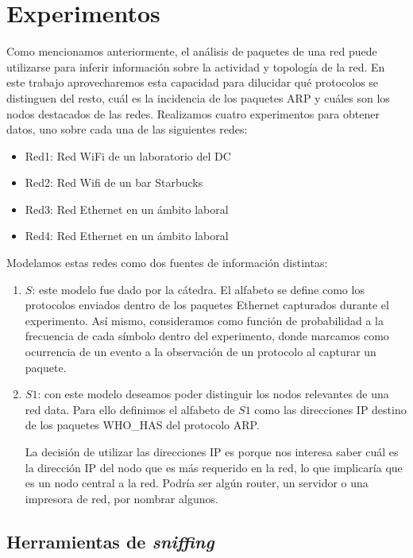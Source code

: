 \section{Experimentos}

Como mencionamos anteriormente, el análisis de paquetes de una red puede utilizarse para inferir información sobre la actividad y topología de la red. En este trabajo aprovecharemos esta capacidad para dilucidar qué protocolos se distinguen del resto, cuál es la incidencia de los paquetes ARP y cuáles son los nodos destacados de las redes.
Realizamos cuatro experimentos para obtener datos, uno sobre cada una de las siguientes redes:
\begin{itemize}
	\item Red1: Red WiFi de un laboratorio del DC
	\item Red2: Red Wifi de un bar Starbucks
	\item Red3: Red Ethernet en un ámbito laboral
	\item Red4: Red Ethernet en un ámbito laboral
\end{itemize}

Modelamos estas redes como dos fuentes de información distintas:
\begin{enumerate}
	\item $S$: este modelo fue dado por la cátedra. El alfabeto se define como los protocolos enviados dentro de los paquetes Ethernet capturados durante el experimento. Así mismo, consideramos como función de probabilidad a la frecuencia de cada símbolo dentro del experimento, donde marcamos como ocurrencia de un evento a la observación de un protocolo al capturar un paquete.
	\item $S1$: con este modelo deseamos poder distinguir los nodos relevantes de una red data. Para ello definimos el alfabeto de $S1$ como las direcciones IP destino de los paquetes WHO\_HAS del protocolo ARP.
	
La decisión de utilizar las direcciones IP es porque nos interesa saber cuál es la dirección IP del nodo que es más requerido en la red, lo que implicaría que es un nodo central a la red. Podría ser algún router, un servidor o una impresora de red, por nombrar algunos.

\end{enumerate}

\subsection{Herramientas de \emph{sniffing}}

